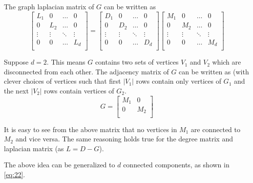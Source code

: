 \documentclass[12pt,a4paper]{article}
\begin{document}
The graph laplacian matrix of $G$ can be written as
\begin{equation}
    \begin{bmatrix}
        L_1 & 0 & \hdots & 0 \\
        0  & L_2 & \hdots & 0  \\
        \vdots & \vdots & \ddots & \vdots \\
        0 & 0 & \hdots & L_d \\
    \end{bmatrix}
    = 
    \begin{bmatrix}
        D_1 & 0 & \hdots & 0 \\
        0  & D_2 & \hdots & 0  \\
        \vdots & \vdots & \ddots & \vdots \\
        0 & 0 & \hdots & D_d \\
    \end{bmatrix}
    \begin{bmatrix}
        M_1 & 0 & \hdots & 0 \\
        0  & M_2 & \hdots & 0  \\
        \vdots & \vdots & \ddots & \vdots \\
        0 & 0 & \hdots & M_d \\
    \end{bmatrix} \label{eq:22}
\end{equation}

Suppose $d=2$. This means $G$ contains two sets of vertices $V_1$ and $V_2$ which are disconnected from each other. The adjacency matrix of $G$ can be written as (with clever choices of vertices such that first $|V_1|$ rows contain only vertices of $G_1$ and the next $|V_2|$ rows contain vertices of $G_2$.
\begin{equation}
    G = 
    \begin{bmatrix}
        M_1 & 0 \\
        0  & M_2\\
    \end{bmatrix}
\end{equation}

It is easy to see from the above matrix that no vertices in $M_1$ are connected to $M_2$ and vice versa. The same reasoning holds true for the degree matrix and laplacian matrix (as $L = D - G$).

The above idea can be generalized to $d$ connected components, as shown in \eqref{eq:22}.
\end{document}
